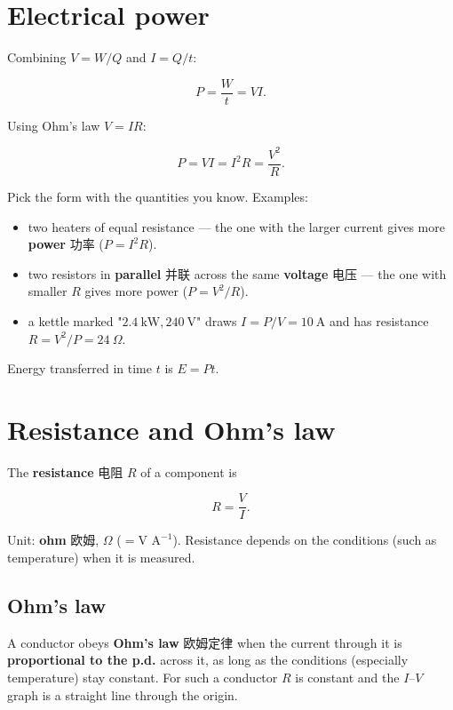 \documentclass[11pt]{article}
\begin{document}
\section*{Electrical power}

Combining $V = W/Q$ and $I = Q/t$:

\[
P = \frac{W}{t} = V I.
\]

Using Ohm's law $V = IR$:

\[
P = V I = I^{2} R = \frac{V^{2}}{R}.
\]

Pick the form with the quantities you know. Examples:

\begin{itemize}
\item two heaters of equal resistance — the one with the larger current gives more \textbf{power} 功率 ($P = I^{2}R$).

\item two resistors in \textbf{parallel} 并联 across the same \textbf{voltage} 电压 — the one with smaller $R$ gives more power ($P = V^{2}/R$).

\item a kettle marked "$2.4\ \text{kW}, 240\ \text{V}$" draws $I = P/V = 10\ \text{A}$ and has resistance $R = V^{2}/P = 24\ \Omega$.

\end{itemize}

Energy transferred in time $t$ is $E = P t$.

\section*{Resistance and Ohm's law}

The \textbf{resistance} 电阻 $R$ of a component is

\[
R = \frac{V}{I}.
\]

Unit: \textbf{ohm} 欧姆, $\Omega$ ($= \text{V A}^{-1}$). Resistance depends on the conditions (such as temperature) when it is measured.

\subsection*{Ohm's law}

A conductor obeys \textbf{Ohm's law} 欧姆定律 when the current through it is \textbf{proportional to the p.d.} across it, as long as the conditions (especially temperature) stay constant. For such a conductor $R$ is constant and the $I$–$V$ graph is a straight line through the origin.
\end{document}
